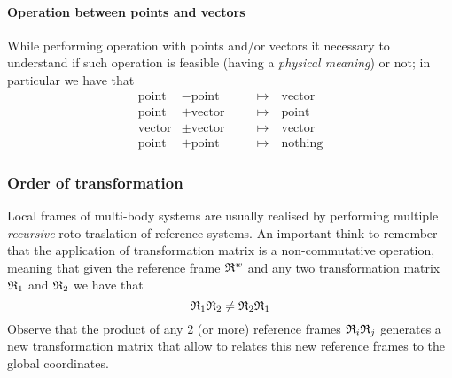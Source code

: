 		\paragraph{Operation between points and vectors} While performing operation with points and/or vectors it necessary to understand if such operation is feasible (having a \textit{physical meaning}) or not; in particular we have that
		\begin{align*}
			\textrm{point} &- \textrm{point} \quad && \mapsto \quad \textrm{vector} \\
			\textrm{point} &+ \textrm{vector} \quad && \mapsto \quad \textrm{point} \\
			\textrm{vector} &\pm \textrm{vector} \quad && \mapsto \quad \textrm{vector} \\
			\textrm{point} &+ \textrm{point} \quad && \mapsto \quad \textrm{nothing} 
		\end{align*}
		
		\subsubsection{Order of transformation} 
		Local frames of multi-body systems are usually realised by performing multiple \textit{recursive} roto-traslation of reference systems. An important think to remember that the application of transformation matrix is a non-commutative operation, meaning that given the reference frame $\mathfrak{R}^w$ and any two transformation matrix $\mathfrak {R}_{1}$ and $\mathfrak {R}_{2}$ we have that
		\[ \mathfrak {R}_{1} \mathfrak {R}_{2} \neq \mathfrak {R}_{2} \mathfrak {R}_{1} \]
		Observe that the product of any 2 (or more) reference frames $\mathfrak {R}_{i} \mathfrak {R}_{j}$ generates a new transformation matrix that allow to relates this new reference frames to the global coordinates.
		
